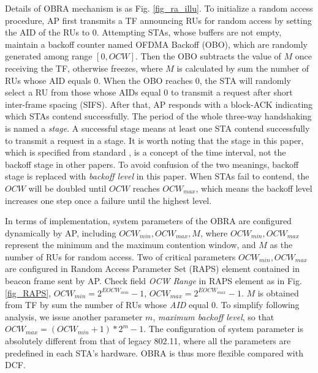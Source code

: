 \documentclass[journal]{IEEEtran}
\begin{document}
Details of OBRA mechanism is as Fig. \ref{fig_ra_illu}. 
To initialize a random access procedure, AP first transmits a TF announcing RUs for random access by setting the AID of the RUs to 0. 
Attempting STAs, whose buffers are not empty, maintain a backoff counter named OFDMA Backoff (OBO), which are randomly generated among range $[0, OCW]$.
Then the OBO subtracts the value of $M$ once receiving the TF, otherwise freezes, where $M$ is calculated by sum the number of RUs whose AID equals 0.  
When the OBO reaches 0, the STA will randomly select a RU from those whose AIDs equal 0 to transmit a request after short inter-frame spacing (SIFS). 
After that, AP responds with a block-ACK indicating which STAs contend successfully. The period of the whole three-way handshaking is named a \textit{stage}.
A successful stage means at least one STA contend successfully to transmit a request in a stage. 
It is worth noting that the stage in this paper, which is specified from standard \cite{draft_ax}, is a concept of the time interval, not the backoff stage in other papers.
To avoid confusion of the two meanings, backoff stage is replaced with \textit{backoff level} in this paper.  
When STAs fail to contend, the $OCW$ will be doubled until $OCW$ reaches $OCW_{max}$, which means the backoff level increases one step once a failure until the highest level.

In terms of implementation, system parameters of the OBRA are configured dynamically by AP, including $OCW_{min}, OCW_{max}, M$, where $OCW_{min}, OCW_{max}$ represent the minimum and the maximum contention window, and $M$ as the number of RUs for random access. 
Two of critical parameters $OCW_{min}, OCW_{max}$ are configured in Random Access Parameter Set (RAPS) element contained in beacon frame sent by AP.
Check field \textit{OCW Range} in RAPS element as in Fig. \ref{fig_RAPS}, $OCW_{min} = 2^{EOCW_{min}}-1$, $OCW_{max} = 2^{EOCW_{max}}-1$. 
$M$ is obtained from TF by sum the number of RUs whose \textit{AID} equal 0.
To simplify following analysis, we issue another parameter $m$, \textit{maximum backoff level}, so that $OCW_{max} = (OCW_{min}+1)*2^m-1$. 
The configuration of system parameter is absolutely different from that of legacy 802.11, where all the parameters are predefined in each STA's hardware. 
OBRA is thus more flexible compared with DCF.



\end{document}

